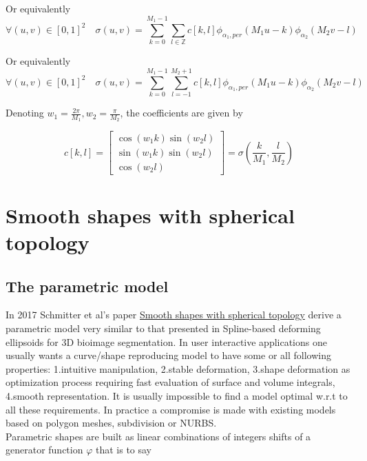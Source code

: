 \documentclass[a4paper, 11pt]{article}
\begin{document}
Or equivalently
\begin{equation}
  \forall (u,v) \in {[0,1]}^2 \quad \sigma(u,v) = \sum_{k=0}^{M_1-1} \sum_{l \in \mathbb{Z}} c[k,l] \phi_{\alpha_1, 
  per}(M_1u-k) \phi_{\alpha_2}(M_2v-l)
\end{equation}

Or equivalently
\begin{equation}
  \boxed{\forall (u,v) \in {[0,1]}^2 \quad \sigma(u,v) = \sum_{k=0}^{M_1-1} \sum_{l=-1}^{M_2+1} c[k,l] \phi_{\alpha_1, 
  per}(M_1u-k) \phi_{\alpha_2}(M_2v-l)}
\end{equation}

Denoting $w_1 = \frac{2\pi}{M_1}, w_2 = \frac{\pi}{M_2}$, the coefficients are given by

\begin{equation}
  \boxed{c[k,l] =\begin{bmatrix} \cos(w_1k)\sin(w_2l) \\ \sin(w_1k)\sin(w_2l) \\ \cos(w_2l) \end{bmatrix} = 
\sigma(\frac{k}{M_1}, \frac{l}{M_2})} \end{equation}

\section{Smooth shapes with spherical topology}

\subsection{The parametric model}

In 2017 Schmitter et al's paper \underline{Smooth shapes with spherical topology} derive a parametric model very similar 
to that presented in Spline-based deforming ellipsoids for 3D bioimage segmentation. In user interactive applications 
one usually wants a curve/shape reproducing model to have some or all following properties: 1.intuitive manipulation, 
2.stable deformation, 3.shape deformation as optimization process requiring fast evaluation of surface and volume 
integrals, 4.smooth representation. It is usually impossible to find a model optimal w.r.t to all these requirements.  
In practice a compromise is made with existing models based on polygon meshes, subdivision or NURBS\@. \\

Parametric shapes are built as linear combinations of integers shifts of a generator function $\varphi$ that is to say
\end{document}
